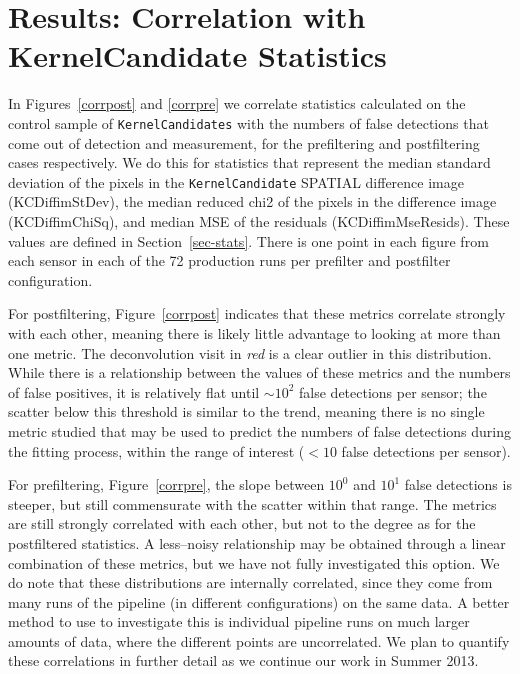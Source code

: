\documentclass[prd, nofootinbib, floatfix, 11pt,tightenlines,times]{article}
\begin{document}
\section{Results: Correlation with KernelCandidate Statistics \label{sec-resstats}}

In Figures~\ref{corrpost} and \ref{corrpre}  we correlate statistics
calculated on the control sample of {\tt KernelCandidates} with the
numbers of false detections that come out of detection and
measurement, for the prefiltering and postfiltering cases
respectively.  We do this for statistics that represent the median
standard deviation of the pixels in the {\tt KernelCandidate} SPATIAL
difference image (KCDiffimStDev), the median reduced chi2 of the
pixels in the difference image (KCDiffimChiSq), and median MSE of the
residuals (KCDiffimMseResids).  These values are defined in
Section~\ref{sec-stats}.  There is one point in each figure from each
sensor in each of the 72 production runs per prefilter and postfilter
configuration.

For postfiltering, Figure~\ref{corrpost} indicates that these metrics
correlate strongly with each other, meaning there is likely little
advantage to looking at more than one metric.  The deconvolution visit
in {\it red} is a clear outlier in this distribution.  While there is
a relationship between the values of these metrics and the numbers of
false positives, it is relatively flat until $\sim 10^2$ false
detections per sensor; the scatter below this threshold is similar to
the trend, meaning there is no single metric studied that may be used
to predict the numbers of false detections during the fitting process,
within the range of interest ($<10$ false detections per sensor).

For prefiltering, Figure~\ref{corrpre}, the slope between $10^0$ and
$10^1$ false detections is steeper, but still commensurate with the
scatter within that range.  The metrics are still strongly correlated
with each other, but not to the degree as for the postfiltered
statistics.  A less--noisy relationship may be obtained through a
linear combination of these metrics, but we have not fully
investigated this option.  
%
We do note that these distributions are internally correlated, since they come from many runs
of the pipeline (in different configurations) on the same data.  A better
method to use to investigate this is individual pipeline runs on much larger amounts of
data, where the different points are uncorrelated.
%
We plan to quantify
these correlations in further detail as we continue our work in Summer
2013.
\end{document}
